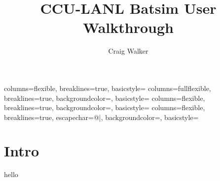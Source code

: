 \documentclass[titlepage]{article}
\author{Craig Walker}
\title{CCU-LANL Batsim User Walkthrough}
\let\oldsection\section
\renewcommand\section{\clearpage\oldsection}
\newenvironment{regular}{\color{black}}{}
\begin{document}
\sffamily
\allsectionsfont{\normalfont\sffamily\bfseries}


{
 	columns=flexible,
 	breaklines=true,
    basicstyle={\normalsize\color{black}\sffamily}
}
{
 	columns=fullflexible,
 	breaklines=true,
	backgroundcolor=\color{black!15},
    basicstyle=\small\color{myTerminalRed}\ttfamily
}
{
 	columns=flexible,
 	breaklines=true,
	backgroundcolor=\color{black!15},
    basicstyle=\small\color{myTerminalRed}\ttfamily
}
{
	columns=flexible,
	breaklines=true,
	escapechar=@|,
	backgroundcolor=\color{codelist!50},
    basicstyle=\small\ttfamily
}


\maketitle
\hypersetup{linkcolor=blue,urlcolor=blue,anchorcolor=blue}
\tableofcontents
\pagebreak

\section{Intro}
\begin{regular}
hello
\end{regular}
\end{document}

